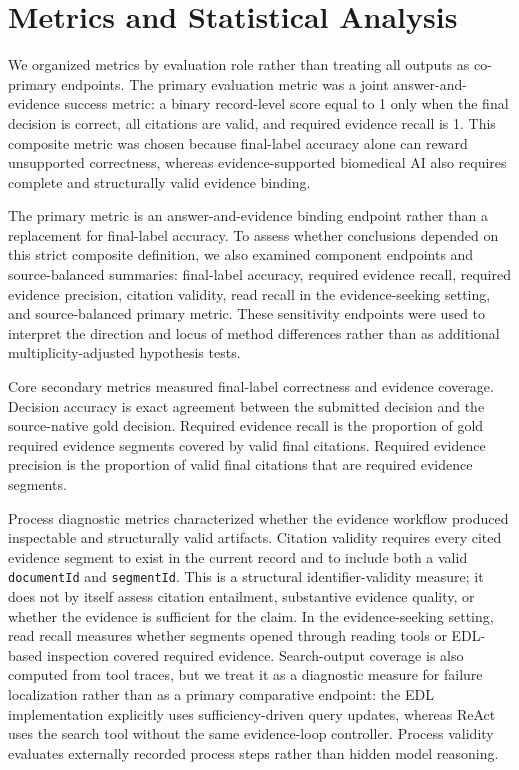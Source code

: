 \documentclass[11pt,a4paper]{article}
\begin{document}
\section{Metrics and Statistical Analysis}

We organized metrics by evaluation role rather than treating all outputs as co-primary endpoints. The primary evaluation metric was a joint answer-and-evidence success metric: a binary record-level score equal to 1 only when the final decision is correct, all citations are valid, and required evidence recall is 1. This composite metric was chosen because final-label accuracy alone can reward unsupported correctness, whereas evidence-supported biomedical AI also requires complete and structurally valid evidence binding.

The primary metric is an answer-and-evidence binding endpoint rather than a replacement for final-label accuracy. To assess whether conclusions depended on this strict composite definition, we also examined component endpoints and source-balanced summaries: final-label accuracy, required evidence recall, required evidence precision, citation validity, read recall in the evidence-seeking setting, and source-balanced primary metric. These sensitivity endpoints were used to interpret the direction and locus of method differences rather than as additional multiplicity-adjusted hypothesis tests.

Core secondary metrics measured final-label correctness and evidence coverage. Decision accuracy is exact agreement between the submitted decision and the source-native gold decision. Required evidence recall is the proportion of gold required evidence segments covered by valid final citations. Required evidence precision is the proportion of valid final citations that are required evidence segments.

Process diagnostic metrics characterized whether the evidence workflow produced inspectable and structurally valid artifacts. Citation validity requires every cited evidence segment to exist in the current record and to include both a valid \texttt{documentId} and \texttt{segmentId}. This is a structural identifier-validity measure; it does not by itself assess citation entailment, substantive evidence quality, or whether the evidence is sufficient for the claim. In the evidence-seeking setting, read recall measures whether segments opened through reading tools or EDL-based inspection covered required evidence. Search-output coverage is also computed from tool traces, but we treat it as a diagnostic measure for failure localization rather than as a primary comparative endpoint: the EDL implementation explicitly uses sufficiency-driven query updates, whereas ReAct uses the search tool without the same evidence-loop controller. Process validity evaluates externally recorded process steps rather than hidden model reasoning.
\end{document}
